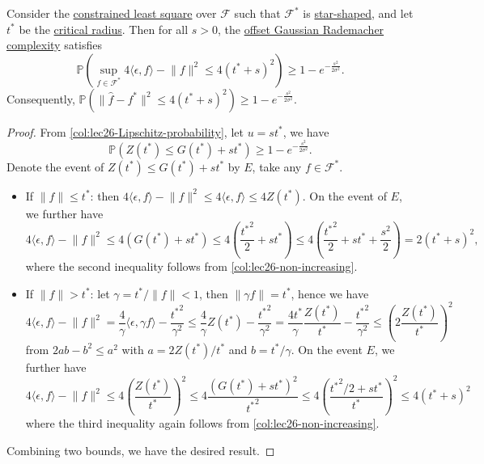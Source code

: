 \begin{theorem}\label{thm:non-asymptotic-bound-on-constrained-LS-offset}
	Consider the \hyperref[prb:constrained-LS]{constrained least square} over \(\mathscr{F} \) such that \(\mathscr{F} ^{\ast} \) is \hyperref[def:star-shaped]{star-shaped}, and let \(t^{\ast} \) be the \hyperref[def:critical-radius]{critical radius}. Then for all \(s > 0\), the \hyperref[def:offset-Gaussian-Rademacher-complexity]{offset Gaussian Rademacher complexity} satisfies
	\[
		\mathbb{P} \left( \sup _{f\in \mathscr{F} ^{\ast} } 4 \langle \epsilon , f \rangle - \lVert f \rVert ^2 \leq 4 (t^{\ast} + s)^2 \right) \geq 1 - e^{-\frac{s^2}{2\sigma ^2}}.
	\]
	Consequently, \(\mathbb{P} ( \lVert \hat{f} - f^{\ast} \rVert ^2 \leq 4 (t^{\ast} + s)^2 ) \geq 1 - e^{-\frac{s^2}{2\sigma ^2}}\).
\end{theorem}
\begin{proof}
	From \autoref{col:lec26-Lipschitz-probability}, let \(u = s t^{\ast} \), we have
	\[
		\mathbb{P} \left( Z(t^{\ast} ) \leq G(t^{\ast} ) + s  t^{\ast}  \right) \geq 1 - e^{- \frac{s^2}{2\sigma ^2}}.
	\]
	Denote the event of \(Z(t^{\ast} ) \leq G(t^{\ast} ) + s t^{\ast} \) by \(E\), take any \(f \in \mathscr{F} ^{\ast} \).
	\begin{itemize}
		\item If \(\lVert f \rVert \leq t^{\ast} \): then \(4 \langle \epsilon , f \rangle - \lVert f \rVert ^2 \leq 4 \langle \epsilon , f \rangle \leq 4 Z(t^{\ast} )\). On the event of \(E\), we further have
		      \[
			      4 \langle \epsilon , f \rangle - \lVert f \rVert ^2
			      \leq 4 (G(t^{\ast} ) + s t^{\ast} )
			      \leq 4 \left( \frac{{t^{\ast} }^2}{2} + s  t^{\ast} \right)
			      \leq 4 \left( \frac{{t^{\ast} }^2}{2} + s  t^{\ast} + \frac{s^2}{2}\right)
			      = 2(t^{\ast} + s)^2,
		      \]
		      where the second inequality follows from \autoref{col:lec26-non-increasing}.
		\item If \(\lVert f \rVert > t^{\ast} \): let \(\gamma = t^{\ast} / \lVert f \rVert < 1\), then \(\lVert \gamma f \rVert = t^{\ast} \), hence we have
		      \[
			      4 \langle \epsilon , f \rangle - \lVert f \rVert ^2
			      = \frac{4}{\gamma } \langle \epsilon , \gamma f \rangle - \frac{{t^{\ast} }^2}{\gamma ^2}
			      \leq \frac{4}{\gamma } Z(t^{\ast} ) - \frac{{t^{\ast} }^2}{\gamma ^2}
			      = \frac{4 t^{\ast} }{\gamma }  \frac{Z(t^{\ast} )}{t^{\ast} } - \frac{{t^{\ast} }^2}{\gamma ^2}
			      \leq \left(2 \frac{Z(t^{\ast} )}{t^{\ast} } \right) ^2
		      \]
		      from \(2ab - b^2 \leq a^2\) with \(a = 2 Z(t^{\ast} ) / t^{\ast} \) and \(b = t^{\ast} / \gamma \). On the event \(E\), we further have
		      \[
			      4 \langle \epsilon , f \rangle - \lVert f \rVert ^2
			      \leq 4 \left( \frac{Z(t^{\ast} )}{t^{\ast} } \right) ^2
			      \leq 4 \frac{( G(t^{\ast} ) + s t^{\ast} )^2}{{t^{\ast} }^2}
			      \leq 4 \left( \frac{{t^{\ast} }^2 / 2 + s t^{\ast} }{t^{\ast} } \right) ^2
			      \leq 4 ( t^{\ast} + s)^2
		      \]
		      where the third inequality again follows from \autoref{col:lec26-non-increasing}.
	\end{itemize}
	Combining two bounds, we have the desired result.
\end{proof}

